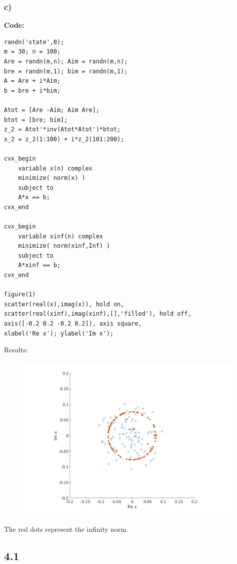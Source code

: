 \documentclass[12pt]{article}
\begin{document}
\subsubsection*{c)}
\textbf{Code:}
\begin{lstlisting}
randn('state',0);
m = 30; n = 100;
Are = randn(m,n); Aim = randn(m,n);
bre = randn(m,1); bim = randn(m,1);
A = Are + i*Aim;
b = bre + i*bim;

Atot = [Are -Aim; Aim Are];
btot = [bre; bim];
z_2 = Atot'*inv(Atot*Atot')*btot;
x_2 = z_2(1:100) + i*z_2(101:200);

cvx_begin
    variable x(n) complex
    minimize( norm(x) )
    subject to
    A*x == b;
cvx_end

cvx_begin
    variable xinf(n) complex
    minimize( norm(xinf,Inf) )
    subject to
    A*xinf == b;
cvx_end

figure(1)
scatter(real(x),imag(x)), hold on,
scatter(real(xinf),imag(xinf),[],'filled'), hold off,
axis([-0.2 0.2 -0.2 0.2]), axis square,
xlabel('Re x'); ylabel('Im x');
\end{lstlisting}
Results:
\begin{figure}[h]
\includegraphics[scale=.25]{39c.jpg}
\end{figure}
The red dots represent the infinity norm.

\subsection*{4.1}
\end{document}
